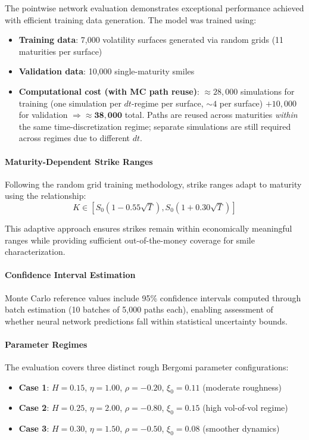 	The pointwise network evaluation demonstrates exceptional performance achieved with efficient training data generation. The model was trained using:
	
	\begin{itemize}[nosep]
		\item \textbf{Training data}: 7{,}000 volatility surfaces generated via random grids (11 maturities per surface)
		\item \textbf{Validation data}: 10{,}000 single-maturity smiles
		\item \textbf{Computational cost (with MC path reuse)}: 
		$\approx 28{,}000$ simulations for training 
		(one simulation per $dt$-regime per surface, $\sim 4$ per surface) 
		$+ 10{,}000$ for validation $\Rightarrow \mathbf{\approx 38{,}000}$ total. 
		Paths are reused across maturities \emph{within} the same time-discretization regime; 
		separate simulations are still required across regimes due to different $dt$.
	\end{itemize}
	
	
	\paragraph{Maturity-Dependent Strike Ranges}
	Following the random grid training methodology, strike ranges adapt to maturity using the relationship:
	\begin{equation}
		K \in [S_0(1 - 0.55\sqrt{T}), S_0(1 + 0.30\sqrt{T})]
	\end{equation}
	
	This adaptive approach ensures strikes remain within economically meaningful ranges while providing sufficient out-of-the-money coverage for smile characterization.
	
	\paragraph{Confidence Interval Estimation}
	Monte Carlo reference values include 95\% confidence intervals computed through batch estimation (10 batches of 5,000 paths each), enabling assessment of whether neural network predictions fall within statistical uncertainty bounds.
	
	\paragraph{Parameter Regimes}
	The evaluation covers three distinct rough Bergomi parameter configurations:
	\begin{itemize}[nosep]
		\item \textbf{Case 1}: $H = 0.15$, $\eta = 1.00$, $\rho = -0.20$, $\xi_0 = 0.11$ (moderate roughness)
		\item \textbf{Case 2}: $H = 0.25$, $\eta = 2.00$, $\rho = -0.80$, $\xi_0 = 0.15$ (high vol-of-vol regime)
		\item \textbf{Case 3}: $H = 0.30$, $\eta = 1.50$, $\rho = -0.50$, $\xi_0 = 0.08$ (smoother dynamics)
	\end{itemize}
	

